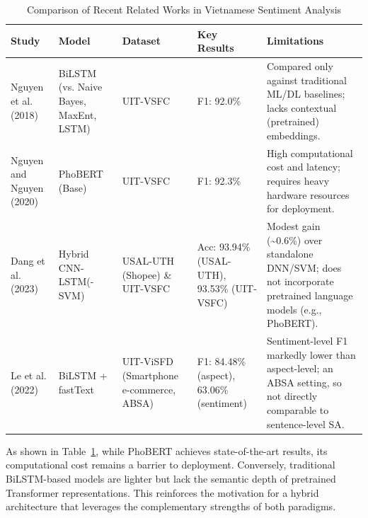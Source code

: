 \documentclass[12pt]{report} %
\begin{document}
\begin{table}[h]
    \centering
    \caption{Comparison of Recent Related Works in Vietnamese Sentiment Analysis}
    \label{tab:related-work}
    \begin{tabular}{|p{2.3cm}|p{2.2cm}|p{2.1cm}|p{1.7cm}|p{4cm}|}
        \hline
        \textbf{Study}                                                            & \textbf{Model}                         & \textbf{Dataset}                        & \textbf{Key Results}                        & \textbf{Limitations}                                                                                                         \\
        \hline
        Nguyen et al. (2018) \cite{nguyen2018nics}                                & BiLSTM (vs. Naive Bayes, MaxEnt, LSTM) & UIT-VSFC                                & F1: 92.0\%                                  & Compared only against traditional ML/DL baselines; lacks contextual (pretrained) embeddings.                                 \\
        \hline
        Nguyen and Nguyen (2020) \cite{nguyen2020phobertpretrainedlanguagemodels} & PhoBERT (Base)                         & UIT-VSFC                                & F1: 92.3\%                                  & High computational cost and latency; requires heavy hardware resources for deployment.                                       \\
        \hline
        Dang et al. (2023) \cite{dang2023hybrid}                                  & Hybrid CNN-LSTM(-SVM)                  & USAL-UTH (Shopee) \& UIT-VSFC           & Acc: 93.94\% (USAL-UTH), 93.53\% (UIT-VSFC) & Modest gain (\textasciitilde0.6\%) over standalone DNN/SVM; does not incorporate pretrained language models (e.g., PhoBERT). \\
        \hline
        Le et al. (2022) \cite{le2022kse}                                         & BiLSTM + fastText                      & UIT-ViSFD (Smartphone e-commerce, ABSA) & F1: 84.48\% (aspect), 63.06\% (sentiment)   & Sentiment-level F1 markedly lower than aspect-level; an ABSA setting, so not directly comparable to sentence-level SA.       \\
        \hline
    \end{tabular}
\end{table}

As shown in Table~\ref{tab:related-work}, while PhoBERT achieves state-of-the-art results, its computational cost remains a barrier to deployment. Conversely, traditional BiLSTM-based models are lighter but lack the semantic depth of pretrained Transformer representations. This reinforces the motivation for a hybrid architecture that leverages the complementary strengths of both paradigms.
\end{document}
